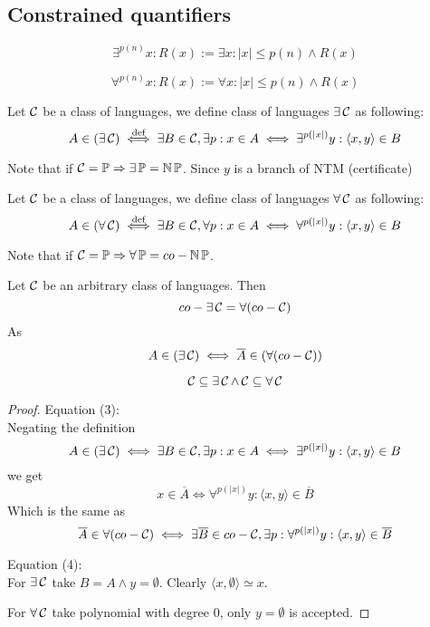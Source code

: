 \subsection{Constrained quantifiers}
\begin{definition}
	\[ \exists^{p(n)} x: R(x) := \exists x: |x| \leq p(n) \land R(x) \]
\end{definition}
\begin{definition}
	\[ \forall^{p(n)} x: R(x) := \forall x: |x| \leq p(n) \land R(x) \]
\end{definition}

\begin{definition}[$\exists \C$]
	Let $\operatorname{\mathcal{C}}$ be a class of languages, we define class of languages $\exists \C$ as following:
	\[ A \in (\exists \operatorname{\mathcal{C}}) \stackrel{\text{def}}{\iff} \exists B \in \operatorname{\mathcal{C}}, \exists p: x \in A \iff \exists^{p(|x|)} y: \langle x, y \rangle \in B \]

	Note that if $\operatorname{\mathcal{C}} = \operatorname{\mathbb{P}} \Rightarrow \exists \operatorname{\mathbb{P}} = \operatorname{\operatorname{\mathbb{N}}\mathbb{P}} $.
	Since $y$ is a branch of NTM (certificate)
\end{definition}

\begin{definition}[$\forall \C$]
	Let $\operatorname{\mathcal{C}}$ be a class of languages, we define class of languages $\forall \C$ as following:
	\[ A \in (\forall \operatorname{\mathcal{C}}) \stackrel{\text{def}}{\iff} \exists B \in \operatorname{\mathcal{C}}, \forall p: x \in A \iff \forall^{p(|x|)} y: \langle x, y \rangle \in B \]

	Note that if $\operatorname{\mathcal{C}} = \operatorname{\mathbb{P}} \Rightarrow \forall \operatorname{\mathbb{P}} = co-\operatorname{\operatorname{\mathbb{N}}\mathbb{P}} $.
\end{definition}

\begin{lemma}\label{quant_class_rel}
	Let $\operatorname{\mathcal{C}}$ be an arbitrary class of languages. Then
	\begin{equation}
		co-\exists \operatorname{\mathcal{C}} = \forall(co-\operatorname{\mathcal{C}})
	\end{equation}
	As
	\[ A \in (\exists \operatorname{\mathcal{C}}) \iff \overline{A} \in (\forall(co-\operatorname{\mathcal{C}})) \]

	\begin{equation}
		\operatorname{\mathcal{C}} \subseteq \exists \operatorname{\mathcal{C}} \land \operatorname{\mathcal{C}} \subseteq \forall \operatorname{\mathcal{C}}
	\end{equation}
\end{lemma}
\begin{proof}
	Equation (3): \\
	Negating the definition
	\[ A \in (\exists \operatorname{\mathcal{C}}) \iff \exists B \in \operatorname{\mathcal{C}}, \exists p: x \in A \iff \exists^{p(|x|)} y: \langle x, y \rangle \in B \]
	we get
	\[ x \in \overline{A} \iff \forall^{p(|x|)} y: \langle x, y \rangle \in \overline{B} \]
	Which is the same as
	\[ \overline{A} \in \forall (co-\operatorname{\mathcal{C}}) \iff \exists \overline{B} \in co-\operatorname{\mathcal{C}}, \exists p: \forall^{p(|x|)} y: \langle x, y \rangle \in \overline{B} \]

	Equation (4): \\
	For $\exists \C$ take $B = A \land y = \emptyset$.
	Clearly $\langle x, \emptyset \rangle \simeq x$.

	For $\forall \C$ take polynomial with degree 0, only $y = \emptyset$ is accepted.
\end{proof}

